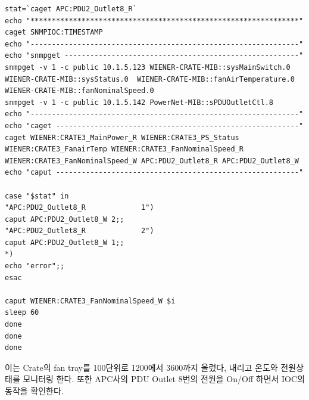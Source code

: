 \documentclass[11pt
  , a4paper
  , article
  , oneside
]{memoir}
\begin{document}
{\begin{lstlisting}[style=termstyle]
stat=`caget APC:PDU2_Outlet8_R`
echo "***************************************************************"
caget SNMPIOC:TIMESTAMP
echo "---------------------------------------------------------------"
echo "snmpget -------------------------------------------------------"
snmpget -v 1 -c public 10.1.5.123 WIENER-CRATE-MIB::sysMainSwitch.0  WIENER-CRATE-MIB::sysStatus.0  WIENER-CRATE-MIB::fanAirTemperature.0 WIENER-CRATE-MIB::fanNominalSpeed.0
snmpget -v 1 -c public 10.1.5.142 PowerNet-MIB::sPDUOutletCtl.8
echo "---------------------------------------------------------------"
echo "caget ---------------------------------------------------------"
caget WIENER:CRATE3_MainPower_R WIENER:CRATE3_PS_Status WIENER:CRATE3_FanairTemp WIENER:CRATE3_FanNominalSpeed_R WIENER:CRATE3_FanNominalSpeed_W APC:PDU2_Outlet8_R APC:PDU2_Outlet8_W 
echo "caput ---------------------------------------------------------"

case "$stat" in
"APC:PDU2_Outlet8_R             1")
caput APC:PDU2_Outlet8_W 2;;
"APC:PDU2_Outlet8_R             2")
caput APC:PDU2_Outlet8_W 1;;
*)
echo "error";;
esac

caput WIENER:CRATE3_FanNominalSpeed_W $i
sleep 60
done
done
done
\end{lstlisting}
}

\hfill

이는 Crate의 fan tray를 100단위로 1200에서 3600까지 올렸다, 내리고 온도와 전원상태를 모니터링 한다. 또한 APC사의 PDU Outlet 8번의 전원을 On/Off 하면서 IOC의 동작을 확인한다. 










\clearpage


\end{document}
